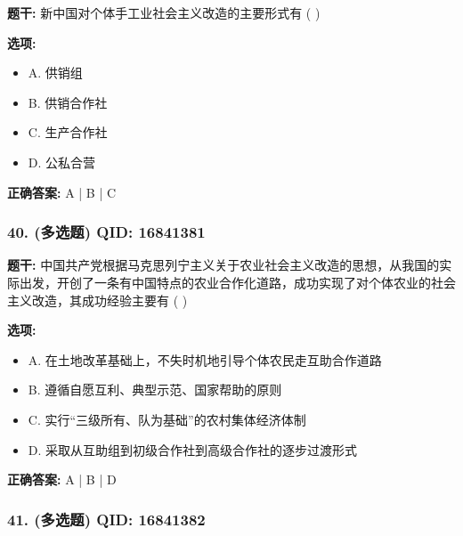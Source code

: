 \documentclass[12pt,UTF8]{ctexart}
\begin{document}
\textbf{题干:}
新中国对个体手工业社会主义改造的主要形式有 ( )

\textbf{选项:}
\begin{itemize}[leftmargin=*]

  \item A. 供销组

  \item B. 供销合作社

  \item C. 生产合作社

  \item D. 公私合营

\end{itemize}

\textbf{正确答案:}
A | B | C

\vspace{0.3em}\hrulefill\vspace{0.7em}

\subsubsection*{40. (多选题) \small QID: 16841381}

\textbf{题干:}
中国共产党根据马克思列宁主义关于农业社会主义改造的思想，从我国的实际出发，开创了一条有中国特点的农业合作化道路，成功实现了对个体农业的社会主义改造，其成功经验主要有 ( )

\textbf{选项:}
\begin{itemize}[leftmargin=*]

  \item A. 在土地改革基础上，不失时机地引导个体农民走互助合作道路

  \item B. 遵循自愿互利、典型示范、国家帮助的原则

  \item C. 实行“三级所有、队为基础”的农村集体经济体制

  \item D. 采取从互助组到初级合作社到高级合作社的逐步过渡形式

\end{itemize}

\textbf{正确答案:}
A | B | D

\vspace{0.3em}\hrulefill\vspace{0.7em}

\subsubsection*{41. (多选题) \small QID: 16841382}
\end{document}
